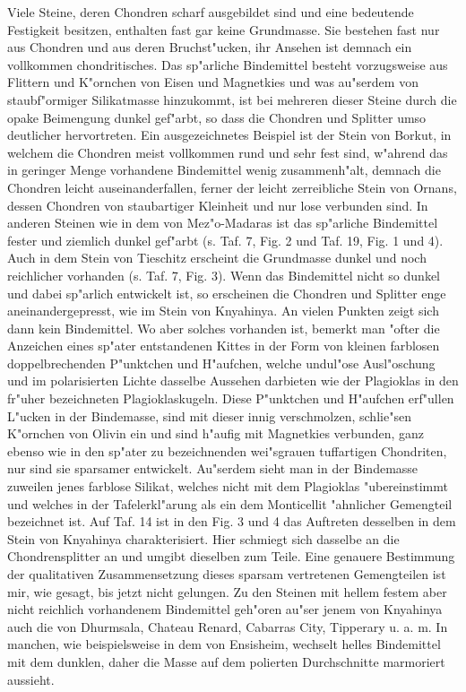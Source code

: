\documentclass[a4paper, 11pt, oneside, polutonikogreek, german]{article}
\begin{document}
Viele Steine, deren Chondren scharf ausgebildet sind und eine bedeutende Festigkeit besitzen, enthalten fast gar keine Grundmasse. Sie bestehen fast nur aus Chondren und aus deren Bruchst"ucken, ihr Ansehen ist demnach ein vollkommen chondritisches. Das sp"arliche Bindemittel besteht vorzugsweise aus Flittern und K"ornchen von Eisen und Magnetkies und was au"serdem von staubf"ormiger Silikatmasse hinzukommt, ist bei mehreren dieser Steine durch die opake Beimengung dunkel gef"arbt, so dass die Chondren und Splitter umso deutlicher hervortreten. Ein ausgezeichnetes Beispiel ist der Stein von Borkut, in welchem die Chondren meist vollkommen rund und sehr fest sind, w"ahrend das in geringer Menge vorhandene Bindemittel wenig zusammenh"alt, demnach die Chondren leicht auseinanderfallen, ferner der leicht zerreibliche Stein von Ornans, dessen Chondren von staubartiger Kleinheit und nur lose verbunden sind. In anderen Steinen wie in dem von Mez"o-Madaras ist das sp"arliche Bindemittel fester und ziemlich dunkel gef"arbt (s. Taf. 7, Fig. 2 und Taf. 19, Fig. 1 und 4). Auch in dem Stein von Tieschitz erscheint die Grundmasse dunkel und noch reichlicher vorhanden (s. Taf. 7, Fig. 3). Wenn das Bindemittel nicht so dunkel und dabei sp"arlich entwickelt ist, so erscheinen die Chondren und Splitter enge aneinandergepresst, wie im Stein von Knyahinya. An vielen Punkten zeigt sich dann kein Bindemittel. Wo aber solches vorhanden ist, bemerkt man "ofter die Anzeichen eines sp"ater entstandenen Kittes in der Form von kleinen farblosen doppelbrechenden P"unktchen und H"aufchen, welche undul"ose Ausl"oschung und im polarisierten Lichte dasselbe Aussehen darbieten wie der Plagioklas in den fr"uher bezeichneten Plagioklaskugeln. Diese P"unktchen und H"aufchen erf"ullen L"ucken in der Bindemasse, sind mit dieser innig verschmolzen, schlie"sen K"ornchen von Olivin ein und sind h"aufig mit Magnetkies verbunden, ganz ebenso wie in den sp"ater zu bezeichnenden wei"sgrauen tuffartigen Chondriten, nur sind sie sparsamer entwickelt. Au"serdem sieht man in der Bindemasse zuweilen jenes farblose Silikat, welches nicht mit dem Plagioklas "ubereinstimmt und welches in der Tafelerkl"arung als ein dem Monticellit "ahnlicher Gemengteil bezeichnet ist. Auf Taf. 14 ist in den Fig. 3 und 4 das Auftreten desselben in dem Stein von Knyahinya charakterisiert. Hier schmiegt sich dasselbe an die Chondrensplitter an und umgibt dieselben zum Teile. Eine genauere Bestimmung der qualitativen Zusammensetzung dieses sparsam vertretenen Gemengteilen ist mir, wie gesagt, bis jetzt nicht gelungen. Zu den Steinen mit hellem festem aber nicht reichlich vorhandenem Bindemittel geh"oren au"ser jenem von Knyahinya auch die von Dhurmsala, Chateau Renard, Cabarras City, Tipperary u. a. m. In manchen, wie beispielsweise in dem von Ensisheim, wechselt helles Bindemittel mit dem dunklen, daher die Masse auf dem polierten Durchschnitte marmoriert aussieht.
\end{document}
